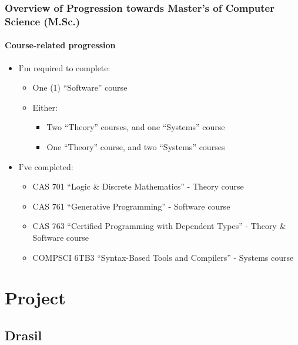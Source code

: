 \documentclass{beamer}
\begin{document}
\begin{frame}
\begin{columns}[T,onlytextwidth]
\begin{column}{.45\textwidth}
        \end{column}
    \end{columns}
\end{frame}

\begin{frame}
    \frametitle{Overview of Progression towards Master's of Computer Science (M.Sc.)}
    \framesubtitle{Course-related progression}
    \begin{itemize}
        \item<1-> I'm required to complete:
            \begin{itemize}
                \item<2-> One (1) ``Software'' course
                \item<3-> Either:
                    \begin{itemize}
                        \item<4-> Two ``Theory'' courses, and one ``Systems'' course
                        \item<4-> One ``Theory'' course, and two ``Systems'' courses
                    \end{itemize}
            \end{itemize}
        \item<5-> I've completed:
            \begin{itemize}
                \item<6-> CAS 701 ``Logic \& Discrete Mathematics'' - Theory course
                \item<6-> CAS 761 ``Generative Programming'' - Software course
                \item<6-> CAS 763 ``Certified Programming with Dependent Types'' - Theory \& Software course
                \item<6-> COMPSCI 6TB3 ``Syntax-Based Tools and Compilers'' - Systems course
            \end{itemize}
    \end{itemize}
\end{frame}

\section{Project}
\subsection{Drasil}
\end{document}
